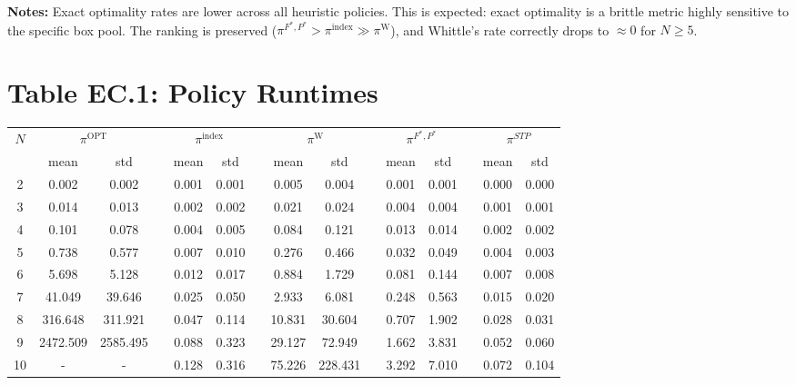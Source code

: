 \documentclass[11pt]{article}
\newcommand{\paperlabel}{\medskip{\large\bfseries\color{red!70!black} Original (Paper)}\par\medskip}
\newcommand{\noteslabel}[1]{\bigskip\noindent\textbf{Notes:} #1}
\begin{document}
\noteslabel{Exact optimality rates are lower across all heuristic policies.
This is expected: exact optimality is a brittle metric highly sensitive to the
specific box pool. The ranking is preserved
($\pi^{F^*,P^*} > \pi^{\textrm{index}} \gg \pi^{\textrm{W}}$), and
Whittle's rate correctly drops to ${\approx}0$ for $N \geq 5$.}

\newpage
\section{Table EC.1: Policy Runtimes}

\paperlabel

\begin{table}[H]
\footnotesize
\centering
\begin{tabular}{cccrccccccccccc}
\toprule
\multirow{2}[3]{*}{$N$} & \multicolumn{2}{c}{$\pi^\textrm{OPT}$} & & \multicolumn{2}{c}{$\pi^{\textrm{index}}$} & & \multicolumn{2}{c}{$\pi^{\textrm{W}}$} & & \multicolumn{2}{c}{$\pi^{F^*,P^*}$} & & \multicolumn{2}{c}{$\pi^{STP}$} \\
\cmidrule{2-3}\cmidrule{5-6}\cmidrule{8-9}\cmidrule{11-12}\cmidrule{14-15}
  & mean & std & & mean & std & & mean & std & & mean & std & & mean & std \\
\midrule
2  & 0.002 & 0.002 & & 0.001 & 0.001 & & 0.005 & 0.004 & & 0.001 & 0.001 & & 0.000 & 0.000 \\
3  & 0.014 & 0.013 & & 0.002 & 0.002 & & 0.021 & 0.024 & & 0.004 & 0.004 & & 0.001 & 0.001 \\
4  & 0.101 & 0.078 & & 0.004 & 0.005 & & 0.084 & 0.121 & & 0.013 & 0.014 & & 0.002 & 0.002 \\
5  & 0.738 & 0.577 & & 0.007 & 0.010 & & 0.276 & 0.466 & & 0.032 & 0.049 & & 0.004 & 0.003 \\
6  & 5.698 & 5.128 & & 0.012 & 0.017 & & 0.884 & 1.729 & & 0.081 & 0.144 & & 0.007 & 0.008 \\
7  & 41.049 & 39.646 & & 0.025 & 0.050 & & 2.933 & 6.081 & & 0.248 & 0.563 & & 0.015 & 0.020 \\
8  & 316.648 & 311.921 & & 0.047 & 0.114 & & 10.831 & 30.604 & & 0.707 & 1.902 & & 0.028 & 0.031 \\
9  & 2472.509 & 2585.495 & & 0.088 & 0.323 & & 29.127 & 72.949 & & 1.662 & 3.831 & & 0.052 & 0.060 \\
\cmidrule{1-1}
10 & - & - & & 0.128 & 0.316 & & 75.226 & 228.431 & & 3.292 & 7.010 & & 0.072 & 0.104 \\

\end{tabular}
\end{table}
\end{document}
